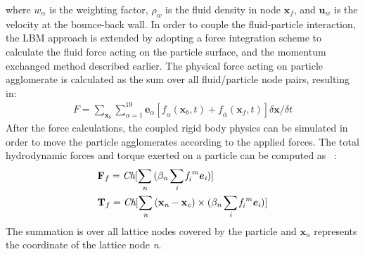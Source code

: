 where $\textit{w}_{\alpha}$ is the weighting factor, $\rho_{\textit{w}}$ is the fluid density in node $\textbf{x}_{\textit{f}}$, and $ \textbf{u}_{\textit{w}}  $ is the velocity at the bounce-back wall. In order to couple the fluid-particle interaction, the LBM approach is extended by adopting a force integration scheme to calculate the fluid force acting on the particle surface, and the momentum exchanged method described earlier. The physical force acting on particle agglomerate is calculated as the sum over all fluid/particle node pairs, resulting in: 
\begin{align}
\textit{F} = \sum\limits_{\textbf{x}_{b}}\sum\limits_{\alpha=1}^{19}{\textbf{e}_{\alpha}[\textit{f}_{\alpha}(\textbf{x}_{b},t)+\textit{f}_{\overline{\alpha}}(\textbf{x}_{f},t)] \delta \textbf{x} / \delta t}
\end{align}
After the force calculations, the coupled rigid body physics can be simulated in order to move the particle agglomerates according to the applied forces. The total hydrodynamic forces and torque exerted on a particle can be computed as ~\citep{cook2004, noble1998}:
\begin{align}
& \textbf{F}_{f} = \textit{Ch}[\sum\limits_{\textit{n}}{(\beta_{\textit{n}} \sum\limits_{\textit{i}}{\textit{f}_{\textit{i}}^{\textit{ m}}\textbf{\textit{e}}_{\textit{i}}}})] \\ 
& \textbf{T}_{f} = \textit{Ch}[\sum\limits_{\textit{n}}{(\textbf{x}_{\textit{n}}-\textbf{x}_{\textit{c}}) \times (\beta_{\textit{n}} \sum\limits_{\textit{i}}{\textit{f}_{\textit{i}}^{\textit{ m}}\textbf{\textit{e}}_{\textit{i}}})}]
\end{align}
The summation is over all lattice nodes covered by the particle and $\textbf{x}_{\textit{n}}$ represents the coordinate of the lattice node \textit{n}.
